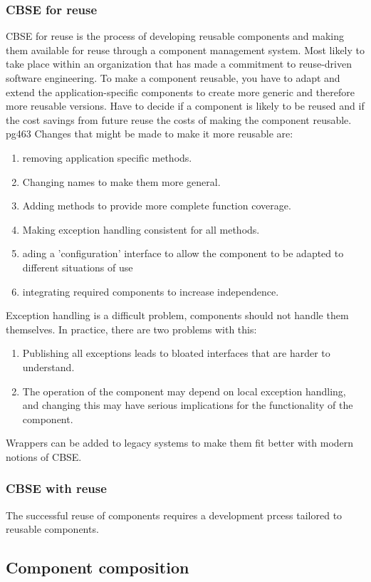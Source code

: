 \documentclass{article}
\begin{document}
\subsubsection{CBSE for reuse}
CBSE for reuse is the process of developing reusable components and making them available for reuse through a component management system.
Most likely to take place within an organization that has made a commitment to reuse-driven software engineering.
To make a component reusable, you have to adapt and extend the application-specific components to create more generic and therefore more reusable versions.
Have to decide if a component is likely to be reused and if the cost savings from future reuse the costs of making the component reusable. pg463
Changes that might be made to make it more reusable are:
\begin{enumerate}
\item removing application specific methods.
\item Changing names to make them more general.
\item Adding methods to provide more complete function coverage.
\item Making exception handling consistent for all methods.
\item ading a 'configuration' interface to allow the component to be adapted to different situations of use
\item integrating required components to increase independence.
\end{enumerate}
Exception handling is a difficult problem, components should not handle them themselves.  In practice, there are two problems with this:
\begin{enumerate}
\item Publishing all exceptions leads to bloated interfaces that are harder to understand.
\item The operation of the component may depend on local exception handling, and changing this may have serious implications for the functionality of the component.
\end{enumerate}

Wrappers can be added to legacy systems to make them fit better with modern notions of CBSE.

\subsubsection{CBSE with reuse}
The successful reuse of components requires a development prcess tailored to reusable components.
\subsection{Component composition}
\end{document}
